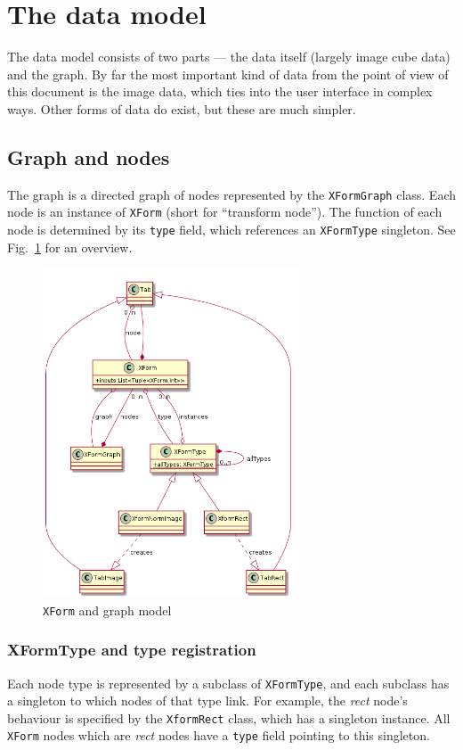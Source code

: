 

\section{The data model}
The data model consists of two parts --- the data itself (largely
image cube data) and the graph. By far the most important kind of data
from the point of view of this document is the image data, which ties
into the user interface in complex ways. Other forms of data do exist,
but these are much simpler.


\subsection{Graph and nodes}
The graph is a directed graph of nodes represented by the 
\texttt{XFormGraph} class. Each node is an instance of \texttt{XForm}
(short for ``transform node''). The function of each node is
determined by its \texttt{type} field, which references an
\texttt{XFormType} singleton. See Fig.~\ref{xform.png} for an overview.

\begin{figure}[ht]
\center
\includegraphics[width=3in]{xform.png}
\caption{\texttt{XForm} and graph model}
\label{xform.png}
\end{figure}

\subsubsection{XFormType and type registration}
Each node type is represented by a subclass of \texttt{XFormType},
and each subclass has a singleton to which nodes of that type link.
For example, the \emph{rect} node's behaviour is specified by
the \texttt{XformRect} class, which has a singleton instance. All
\texttt{XForm} nodes which are \emph{rect} nodes have a \texttt{type} field
pointing to this singleton.

